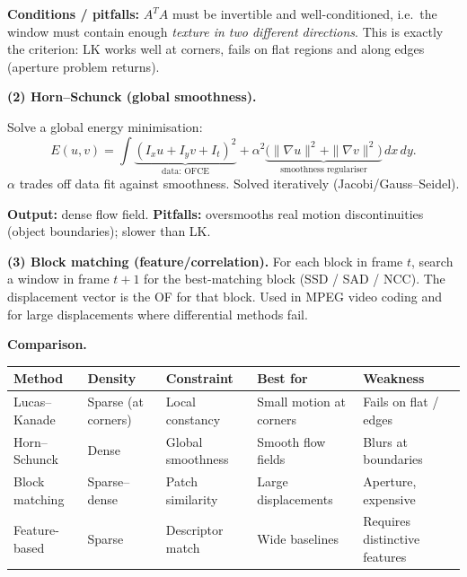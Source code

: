 \textbf{Conditions / pitfalls:} $A^T A$ must be invertible and well-conditioned, i.e.\ the window must contain enough \emph{texture in two different directions}. This is exactly the  criterion: LK works well at corners, fails on flat regions and along edges (aperture problem returns).

\textbf{(2) Horn--Schunck (global smoothness).}

\begin{thmbox}
Solve a global energy minimisation:
\[
E(u,v) = \int \! \underbrace{(I_x u + I_y v + I_t)^2}_{\text{data: OFCE}} + \alpha^2 \underbrace{\bigl(\|\nabla u\|^2 + \|\nabla v\|^2\bigr)}_{\text{smoothness regulariser}} \,dx\,dy.
\]
$\alpha$ trades off data fit against smoothness. Solved iteratively (Jacobi/Gauss--Seidel).
\end{thmbox}

\textbf{Output:} dense flow field. \textbf{Pitfalls:} oversmooths real motion discontinuities (object boundaries); slower than LK.

\textbf{(3) Block matching (feature/correlation).} For each block in frame $t$, search a window in frame $t+1$ for the best-matching block (SSD / SAD / NCC). The displacement vector is the OF for that block. Used in MPEG video coding and for large displacements where differential methods fail.

\separator

\textbf{Comparison.}

\begin{center}
\renewcommand{\arraystretch}{1.3}
\begin{tabular}{@{} l l l l l @{}}
\toprule
\textbf{Method} & \textbf{Density} & \textbf{Constraint} & \textbf{Best for} & \textbf{Weakness} \\
\midrule
Lucas--Kanade & Sparse (at corners) & Local constancy & Small motion at corners & Fails on flat / edges \\
Horn--Schunck & Dense & Global smoothness & Smooth flow fields & Blurs at boundaries \\
Block matching & Sparse--dense & Patch similarity & Large displacements & Aperture, expensive \\
Feature-based & Sparse & Descriptor match & Wide baselines & Requires distinctive features \\
\bottomrule
\end{tabular}
\end{center}

\bigseparator


